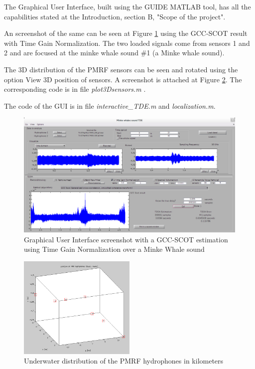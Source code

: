 The Graphical User Interface, built using the GUIDE MATLAB tool, has all the capabilities stated at the Introduction, section B, "Scope of the project".

An screenshot of the same can be seen at Figure \ref{fig:GUI} using the GCC-SCOT result with Time Gain Normalization. The two loaded signals come from sensors 1 and 2 and are focused at the minke whale sound \#1 (a Minke whale sound).

The 3D distribution of the PMRF sensors can be seen and rotated using the option View 3D position of sensors. A screenshot is attached at Figure \ref{fig:3D_sensors}. The corresponding code is in file \emph{plot3Dsensors.m} \cite{plot3Dsensors.m}.

The code of the GUI is in file \emph{interactive\_TDE.m}\cite{interactiveTDE.m} and \emph{localization.m}\cite{localization.m}.

\begin{figure}[!t]
	\begin{center}
		\includegraphics[width=1\textwidth]{figures/GUI_SCOT.png}
	\end{center}
	\caption{Graphical User Interface screenshot with a GCC-SCOT estimation using Time Gain Normalization over a Minke Whale sound}
	\label{fig:GUI}
\end{figure}

\begin{figure}[htb]
	\begin{center}
		\includegraphics[width=0.5\textwidth]{figures/3D_sensors.png}
	\end{center}
	\caption{Underwater distribution of the PMRF hydrophones in kilometers}
	\label{fig:3D_sensors}
\end{figure}
